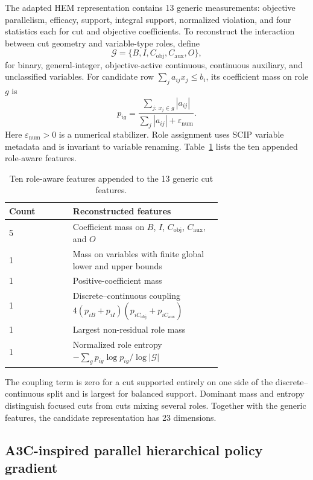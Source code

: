 \documentclass[preprint,12pt,authoryear]{elsarticle}
\begin{document}
The adapted HEM representation contains 13 generic measurements: objective
parallelism, efficacy, support, integral support, normalized violation, and
four statistics each for cut and objective coefficients. To reconstruct the
interaction between cut geometry and variable-type roles, define
\[
 \mathcal G=\{B,I,C_{\mathrm{obj}},C_{\mathrm{aux}},O\},
\]
for binary, general-integer, objective-active continuous, continuous
auxiliary, and unclassified variables. For candidate row
$\sum_j a_{ij}x_j\le b_i$, its coefficient mass on role $g$ is
\begin{equation}
 p_{ig}=
 \frac{\sum_{j:\,x_j\in g}|a_{ij}|}
      {\sum_j|a_{ij}|+\varepsilon_{\mathrm{num}}}.
 \label{eq:role-mass}
\end{equation}
Here $\varepsilon_{\mathrm{num}}>0$ is a numerical stabilizer. Role assignment
uses SCIP variable metadata and is invariant to variable renaming.
Table~\ref{tab:features} lists the ten appended role-aware features.

\begin{table}[htbp]
\centering
\caption{Ten role-aware features appended to the 13 generic cut features.}
\label{tab:features}
\begin{tabular}{lp{0.70\linewidth}}
\toprule
Count & Reconstructed features \\
\midrule
5 & Coefficient mass on $B$, $I$, $C_{\mathrm{obj}}$,
$C_{\mathrm{aux}}$, and $O$ \\
1 & Mass on variables with finite global lower and upper bounds \\
1 & Positive-coefficient mass \\
1 & Discrete--continuous coupling
$4(p_{iB}+p_{iI})(p_{iC_{\mathrm{obj}}}+p_{iC_{\mathrm{aux}}})$ \\
1 & Largest non-residual role mass \\
1 & Normalized role entropy
$-\sum_g p_{ig}\log p_{ig}/\log|\mathcal G|$ \\
\bottomrule
\end{tabular}
\end{table}

The coupling term is zero for a cut supported entirely on one side of the
discrete--continuous split and is largest for balanced support. Dominant mass
and entropy distinguish focused cuts from cuts mixing several roles. Together
with the generic features, the candidate representation has 23 dimensions.

\subsection{A3C-inspired parallel hierarchical policy gradient}
\end{document}
